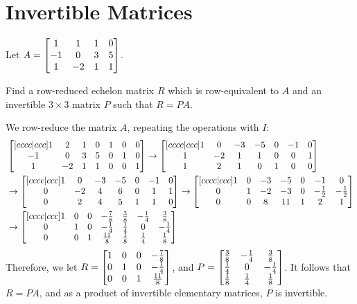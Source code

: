 \documentclass[notes]{agony}
\begin{document}


\section{Invertible Matrices}

\begin{xca}\label{xca:rpa}
  Let $A = \mqty[1&1&1&0 \\ -1&0&3&5 \\ 1&-2&1&1]$.

  Find a row-reduced echelon matrix $R$ which is row-equivalent to $A$
  and an invertible $3 \times 3$ matrix $P$ such that $R = PA$.
\end{xca}
\begin{sol}
  We row-reduce the matrix $A$, repeating the operations with $I$:
  \begin{equation*}
    \begin{split}
      & \bmqty[cccc|ccc]{1&2&1&0 & 1&0&0 \\ -1&0&3&5 & 0&1&0 \\ 1&-2&1&1 & 0&0&1}
      \to \bmqty[cccc|ccc]{1&0&-3&-5 & 0&-1&0 \\ 1&-2&1&1 & 0&0&1 \\ 1&2&1&0 & 1&0&0} \\
      & \to \bmqty[cccc|ccc]{1&0&-3&-5 & 0&-1&0 \\ 0&-2&4&6 & 0&1&1 \\ 0&2&4&5 & 1&1&0}
      \to \bmqty[cccc|ccc]{1&0&-3&-5 & 0&-1&0 \\ 0&1&-2&-3 & 0&-\frac12&-\frac12 \\ 0&0&8&11 & 1&2&1} \\
      & \to \bmqty[cccc|ccc]{1&0&0&-\frac78 & \frac38&-\frac14&\frac38 \\ 0&1&0&-\frac14 & \frac14&0&-\frac14 \\ 0&0&1&\frac{11}8 & \frac18&\frac14&\frac18}
    \end{split}
  \end{equation*}
  Therefore, we let $R = \mqty[\mqty{\imat{3}} & \mqty{-\frac78\\-\frac14\\\frac{11}8}]$,
  and $P = \mqty[\frac38&-\frac14&\frac38 \\ \frac14&0&-\frac14 \\ \frac18&\frac14&\frac18]$.
  It follows that $R = PA$, and as a product of invertible elementary matrices, $P$ is invertible.
\end{sol}
\end{document}
